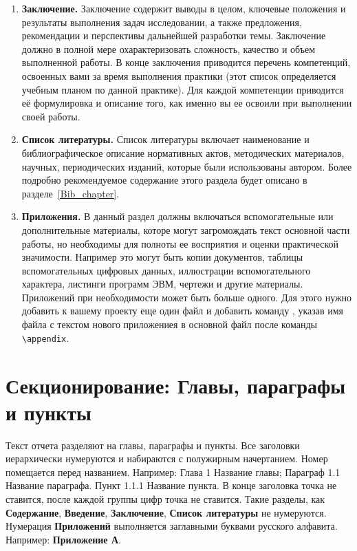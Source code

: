 \begin{enumerate}
\item \textbf{Заключение.} Заключение содержит выводы в целом, ключевые
положения и результаты выполнения задач исследовании, а также предложения,
рекомендации и перспективы дальнейшей разработки темы. Заключение должно
в полной мере охарактеризовать сложность, качество и объем выполненной работы.
В конце заключения приводится перечень компетенций, освоенных вами за время
выполнения практики (этот список определяется учебным планом по данной
практике). Для каждой компетенции приводится её формулировка и описание
того, как именно вы ее освоили при выполнении своей работы.
    
\item \textbf{Список литературы.} Список литературы включает наименование и
библиографическое описание нормативных актов, методических материалов,
научных, периодических изданий, которые были использованы автором. Более
подробно рекомендуемое содержание этого раздела будет описано в
разделе~\ref{Bib_chapter}.
    
\item \textbf{Приложения.} В данный раздел должны включаться вспомогательные
или дополнительные материалы, которе могут загромождать текст основной части
работы, но необходимы для полноты ее восприятия и оценки практической
значимости. Например это могут быть копии документов, таблицы вспомогательных
цифровых данных, иллюстрации вспомогательного характера, листинги программ ЭВМ,
чертежи и другие материалы. Приложений при необходимости может быть больше
одного. Для этого нужно добавить к вашему проекту еще один файл и добавить
команду \verb||, указав имя файла с текстом нового приложениея в
основной файл после команды \verb|\appendix|. 
\end{enumerate}

\section{Секционирование: Главы, параграфы и пункты}

Текст отчета разделяют на главы, параграфы и пункты.
Все заголовки иерархически нумеруются и набираются с полужирным начертанием.
Номер помещается перед названием. Например: Глава 1 Название главы; 
Параграф 1.1 Название параграфа. Пункт 1.1.1 Название пункта. В конце
заголовка точка не ставится, после каждой группы цифр точка не ставится.
Такие разделы, как \textbf{Содержание}, \textbf{Введение}, \textbf{Заключение},
\textbf{Список литературы} не нумеруются. Нумерация \textbf{Приложений}
выполняется заглавными буквами русского алфавита. Например:
\textbf{Приложение А}.

